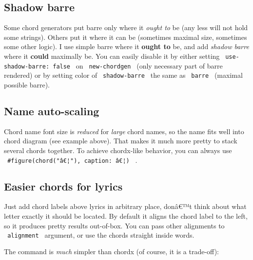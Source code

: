 \subsection{Shadow barre}\label{shadow-barre}

Some chord generators put barre only where it \emph{ought to} be (any
less will not hold some strings). Others put it where it can be
(sometimes maximal size, sometimes some other logic). I use simple barre
where it \textbf{ought to} be, and add \emph{shadow barre} where it
\textbf{could} maximally be. You can easily disable it by either setting
\texttt{\ use-shadow-barre:\ false\ } on \texttt{\ new-chordgen\ } (only
necessary part of barre rendered) or by setting color of
\texttt{\ shadow-barre\ } the same as \texttt{\ barre\ } (maximal
possible barre).

\subsection{Name auto-scaling}\label{name-auto-scaling}

Chord name font size is \emph{reduced} for \emph{large} chord names, so
the name fits well into chord diagram (see example above). That makes it
much more pretty to stack several chords together. To achieve
chordx-like behavior, you can always use
\texttt{\ \#figure(chord("â€¦"),\ caption:\ â€¦)\ } .

\subsection{Easier chords for lyrics}\label{easier-chords-for-lyrics}

Just add chord labels above lyrics in arbitrary place, donâ€™t think
about what letter exactly it should be located. By default it aligns the
chord label to the left, so it produces pretty results out-of-box. You
can pass other alignments to \texttt{\ alignment\ } argument, or use the
chords straight inside words.

The command is \emph{much} simpler than chordx (of course, it is a
trade-off):

\begin{Shaded}
\begin{Highlighting}[]
\end{Highlighting}
\end{Shaded}

